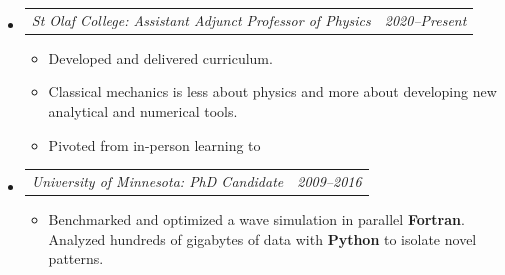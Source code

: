 \documentclass[12pt,letterpaper]{article}
\makeatletter
\newcommand{\headerpair}[2]{
    \begin{tabular*}{\linewidth}{l@{ \extracolsep{\fill} }r} {\large\emph{#1}} & {\large\emph{#2}}
    \end{tabular*}
}
\newcommand{\headerrow}[3]{\headerpair{#2: #1}{#3}}
\makeatother
\begin{document}
\begin{itemize}[leftmargin=\parindent]
\begin{itemize}[leftmargin=\parindent]


        \end{itemize}



    \item[]
        \headerrow
            {Assistant Adjunct Professor of Physics}
            {St Olaf College}
            {2020--Present}
        \begin{itemize}[leftmargin=\parindent]

            \item Developed and delivered curriculum.
            \item Classical mechanics is less about physics and more about developing new analytical and numerical tools.
            \item Pivoted from in-person learning to



        \end{itemize}

    \item[]
        \headerrow
            {PhD Candidate}
            {University of Minnesota}
            {2009--2016}
        \begin{itemize}[leftmargin=\parindent]
            \item Benchmarked and optimized a wave simulation in parallel \textbf{Fortran}. Analyzed hundreds of gigabytes of data with \textbf{Python} to isolate novel patterns.



\end{itemize}
\end{itemize}
\end{document}
